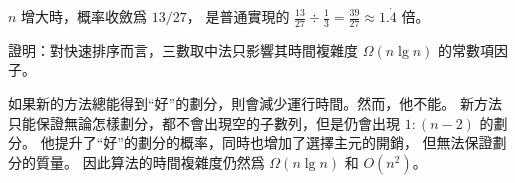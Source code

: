 $n$ 增大時，概率收斂爲 $13/27$，
是普通實現的 $\frac{13}{27} \div \frac{1}{3} = \frac{39}{27} \approx 1.\dot{4}$ 倍。
\stopANSWER

\startigBase[a,continue]\startitem
證明：對快速排序而言，三數取中法只影響其時間複雜度 $\Omega(n\lg{n})$ 的常數項因子。
\stopitem\stopigBase

\startANSWER
如果新的方法總能得到“好”的劃分，則會減少運行時間。然而，他不能。
新方法只能保證無論怎樣劃分，都不會出現空的子數列，但是仍會出現 $1:(n-2)$ 的劃分。
他提升了“好”的劃分的概率，同時也增加了選擇主元的開銷，
但無法保證劃分的質量。
因此算法的時間複雜度仍然爲 $\Omega(n\lg{n})$ 和 $O(n^2)$。
\stopANSWER

\stopPROBLEM
